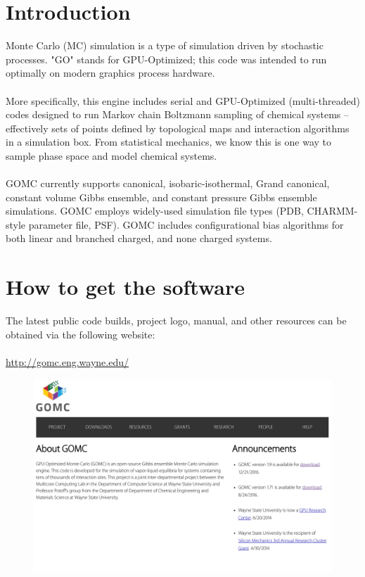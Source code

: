 \section{Introduction}
Monte Carlo (MC) simulation is a type of simulation driven by stochastic processes.  "GO" stands for GPU-Optimized; this code was intended to run optimally on modern graphics process hardware.\\\\
More specifically, this engine includes serial and GPU-Optimized (multi-threaded) codes designed to run Markov chain Boltzmann sampling of chemical systems -- effectively sets of points defined by topological maps and interaction algorithms in a simulation box.  From statistical mechanics, we know this is one way to sample phase space and model chemical systems.\\\\
GOMC currently supports canonical, isobaric-isothermal, Grand canonical, constant volume Gibbs ensemble, and constant pressure Gibbs ensemble simulations.  GOMC employs widely-used simulation file types (PDB, CHARMM-style parameter file, PSF).  GOMC includes configurational bias algorithms for both linear and branched charged, and none charged systems. 

\section{How to get the software}
The latest public code builds, project logo, manual, and other resources can be obtained via the following website:\\\\
\url{http://gomc.eng.wayne.edu/}

\begin{figure}[H]
\centering
\includegraphics[scale=0.15]{images/website}
\end{figure}

